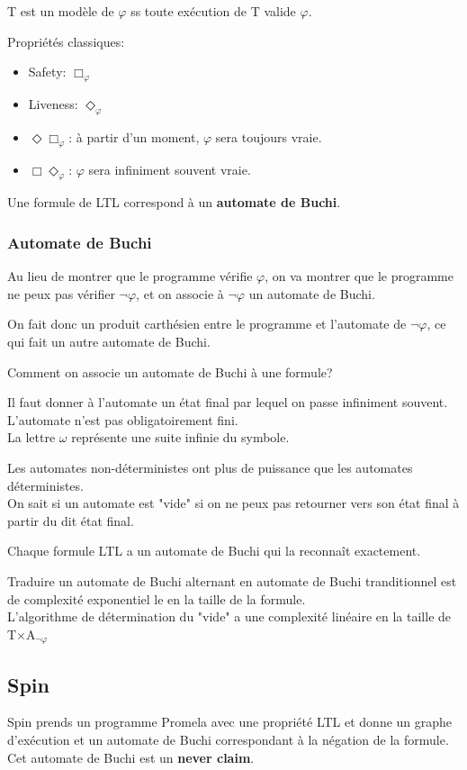 T est un modèle de $\varphi$ ss toute exécution de T
valide $\varphi$.

Propriétés classiques:
\begin{itemize}
	\item Safety: $\Box_\varphi$
	\item Liveness: $\Diamond_\varphi$
	\item $\Diamond\Box_\varphi$: à partir d'un
	moment, $\varphi$ sera toujours vraie.
	\item $\Box\Diamond_\varphi$: $\varphi$ sera
	infiniment souvent vraie.
\end{itemize}

Une formule de LTL correspond à un
\textbf{automate de Buchi}.

\subsubsection{Automate de Buchi}
Au lieu de montrer que le programme vérifie
$\varphi$, on va montrer que le programme ne peux
pas vérifier $\lnot\varphi$, et on associe à
$\lnot\varphi$ un automate de Buchi.

On fait donc un produit carthésien entre le
programme et l'automate de $\lnot\varphi$, ce qui
fait un autre automate de Buchi.

Comment on associe un automate de Buchi à une
formule?

Il faut donner à l'automate un état final par
lequel on passe infiniment souvent. L'automate n'est
pas obligatoirement fini.\\
La lettre $\omega$ représente une suite infinie du
symbole.

Les automates non-déterministes ont plus de
puissance que les automates déterministes.\\
On sait si un automate est "vide" si on ne peux pas
retourner vers son état final à partir du dit
état final.

Chaque formule LTL a un automate de Buchi qui la
reconnaît exactement.

Traduire un automate de Buchi alternant en automate 
de Buchi tranditionnel est de complexité exponentiel
le en la taille de la formule.\\
L'algorithme de détermination du "vide" a une
complexité linéaire en la taille de
T$\times$A$_{\lnot\varphi}$

\subsection{Spin}
Spin prends un programme Promela avec une propriété
LTL et donne un graphe d'exécution et un automate
de Buchi correspondant à la négation de la
formule.\\
Cet automate de Buchi est un \textbf{never claim}.
